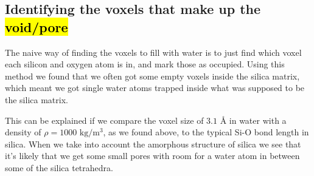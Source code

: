 \begin{itemize}
\end{itemize}

\subsection[Identifying the voxels that make up the void/pore]{Identifying the voxels that make up the \hl{void/pore}\label{sec:inject_water_find_empty_voxels}}
The naive way of finding the voxels to fill with water is to just find which voxel each silicon and oxygen atom is in, and mark those as occupied. Using this method we found that we often got some empty voxels inside the silica matrix, which meant we got single water atoms trapped inside what was supposed to be the silica matrix. 

This can be explained if we compare the voxel size of $3.1 \text{ \AA}$ in water with a density of $\rho = 1000\text{ kg/m$^3$}$, as we found above, to the typical Si-O bond length in silica. When we take into account the amorphous structure of silica we see that it's likely that we get some small pores with room for a water atom in between some of the silica tetrahedra.

